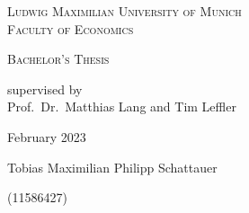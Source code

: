 \begin{titlepage}
    \vspace*{\fill}
    \centering

    \textsc{\Large Ludwig Maximilian University of Munich}\\
    \textsc{Faculty of Economics}


    \vspace{4cm}

    \begin{doublespace}
        \makeatletter
        \textsc{ \Huge \@title}
        \textsc{\Large \@subtitle}
        \makeatother
    \end{doublespace}


    \vspace{3cm}
    \huge \textsc{Bachelor's Thesis}



    \vspace{0.3cm}
    \large \textrm{supervised by\\Prof.~Dr.~Matthias Lang and Tim Leffler}

    \vspace{2cm}
    \huge
    \textrm{February 2023}

    \vspace{2cm}
    \Large{\textrm{Tobias Maximilian Philipp Schattauer}}

    (11586427)

    \vspace*{\fill}
\end{titlepage}





